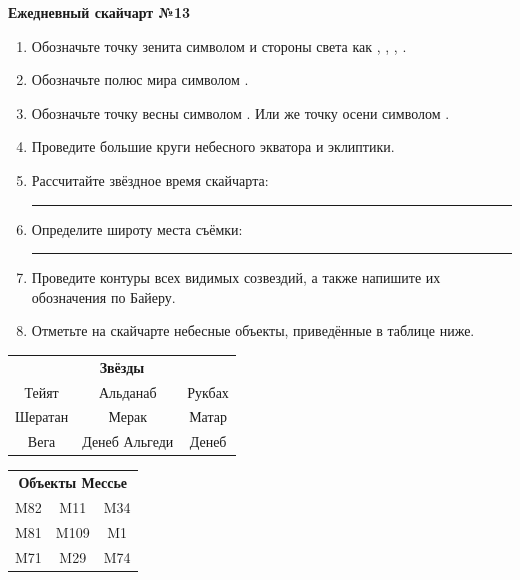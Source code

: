 \documentclass{./SAS-class-skygen}
\begin{document}
    
    
    
	\begin{center}
		\large\textbf{Ежедневный скайчарт №13}
	\end{center}

	\begin{enumerate}
		\item Обозначьте точку зенита символом  и стороны света как , , , .
		\item Обозначьте полюс мира символом .
		\item Обозначьте точку весны символом \Aries. Или же точку осени символом \Libra.
		\item Проведите большие круги небесного экватора и эклиптики.
		\item Рассчитайте звёздное время скайчарта: \rule{2cm}{0.4pt}
		\item Определите широту места съёмки: \rule{2cm}{0.4pt}
		\item Проведите контуры всех видимых созвездий, а также напишите их обозначения по Байеру.
		\item Отметьте на скайчарте небесные объекты, приведённые в таблице ниже.
	\end{enumerate}
	
    \vspace{0.5cm}

    \begin{table}[h!]
    \centering
    \begin{tabular}{ccc}
    \multicolumn{3}{c}{\textbf{Звёзды}} \\ Тейят & Альданаб & Рукбах \\
Шератан & Мерак & Матар \\
Вега & Денеб Альгеди & Денеб \\

\end{tabular}
    \hfill
    \begin{tabular}{ccc}
    \multicolumn{3}{c}{\textbf{Объекты Мессье}} \\ M82 & M11 & M34 \\
M81 & M109 & M1 \\
M71 & M29 & M74 \\

\end{tabular}
    \end{table}
	
\end{document}
